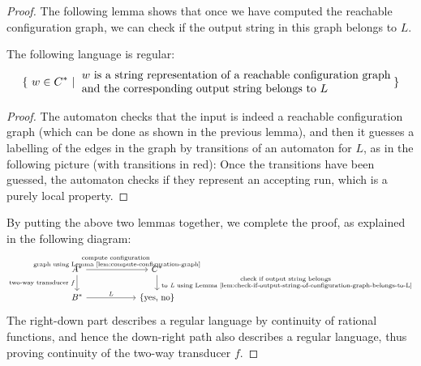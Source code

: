 \begin{proof}
    The following lemma shows that once we have computed the reachable configuration graph, we can check if the output string in this graph belongs to $L$.

    \begin{lemma}\label{lem:check-if-output-string-of-configuration-graph-belongs-to-L}
        The following language is regular:
        \begin{align*}
        \setbuild{ w \in C^*}{$w$ is a string representation of a reachable configuration graph \\ and the corresponding output string belongs to $L$}
        \end{align*}
    \end{lemma}

    \begin{proof}
        The automaton checks that the input is indeed a reachable configuration graph (which can be done as shown in the previous lemma), and then it guesses a labelling of the edges in the graph by transitions of an automaton for $L$, as in the following picture (with transitions in red):
        Once the transitions have been guessed, the automaton checks if they represent an accepting run, which is a purely local property.
    \end{proof}

    By putting the above two lemmas together, we complete the proof, as explained in the following diagram: 
    \[
    \begin{tikzcd}[column sep=2cm]
    A^* \ar[r,"{\scriptsize\shortstack[c]{\text{compute configuration }\\[-2pt]\text{graph using Lemma~\ref{lem:compute-configuration-graph}}}}"]
    \ar[d,"\text{two-way transducer $f$}"'] & C^*
    \ar[d,"{\scriptsize\shortstack[c]{\text{check if output string belongs}\\[-2pt]\text{ to \emph{L} using Lemma~\ref{lem:check-if-output-string-of-configuration-graph-belongs-to-L}}}}"] \\
    B^* \ar[r, "L"] & \set{\text{yes, no}}
    \end{tikzcd}
    \]
    The right-down part describes a regular language by continuity of rational functions, and hence the down-right path also describes a regular language, thus proving continuity of the two-way transducer $f$.
\end{proof}


